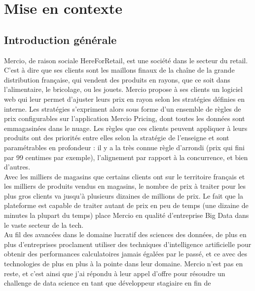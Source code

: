 \documentclass{rapportCS}
\begin{document}
\tabledematieres %




\section{Mise en contexte} 

\subsection{Introduction générale}
	Mercio, de raison sociale HereForRetail, est une société dans le secteur du retail. 
	C'est à dire que ses clients sont les maillons finaux de la chaîne de la grande distribution 
	française, qui vendent des produits en rayons, que ce soit dans l'alimentaire, le bricolage, 
	ou les jouets. Mercio propose à ses clients un logiciel web qui leur permet d'ajuster leurs prix 
	en rayon selon les stratégies définies en interne. Les stratégies s'expriment alors sous forme 
	d'un ensemble de règles de prix configurables sur l'application Mercio Pricing, dont toutes les 
	données sont emmagasinées dans le nuage. Les règles que ces clients peuvent appliquer à leurs 
	produits ont des priorités entre elles selon la stratégie de l'enseigne et sont paramétrables en 
	profondeur : il y a la très connue règle d'arrondi (prix qui fini par 99 centimes par exemple), 
	l'alignement par rapport à la concurrence, et bien d'autres. \\
	Avec les milliers de magasins que certains clients ont sur le territoire français et les milliers 
	de produits vendus en magasins, le nombre de prix à traiter pour les plus gros clients va jusqu'à 
	plusieurs dizaines de millions de prix. Le fait que la plateforme est capable de traiter autant de 
	prix en peu de temps (une dizaine de minutes la plupart du temps) place Mercio en qualité 
	d'entreprise Big Data dans le vaste secteur de la tech.\\
	Au fil des avancées dans le domaine lucratif des sciences des données, de plus en plus 
	d'entreprises proclament utiliser des techniques d'intelligence artificielle pour obtenir des 
	performances calculatoires jamais égalées par le passé, et ce avec des technologies de plus en plus
	à la pointe dans leur domaine. 
	Mercio n'est pas en reste, et c'est ainsi que j'ai répondu à leur appel
	d'offre pour résoudre un challenge de data science en tant que développeur stagiaire en fin de 
\end{document}
